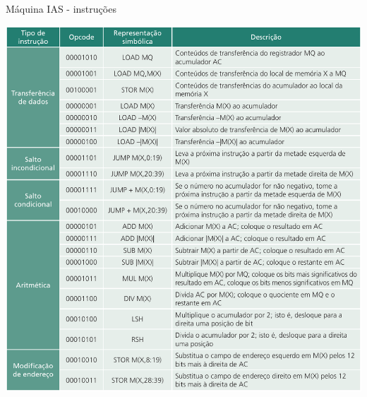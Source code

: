 \begin{slide}[toc=]{Máquina IAS - instruções}
\begin{center}
   \includegraphics[height=0.8\textheight]{figs/iasinstrucoes} 
\end{center}
\end{slide}

